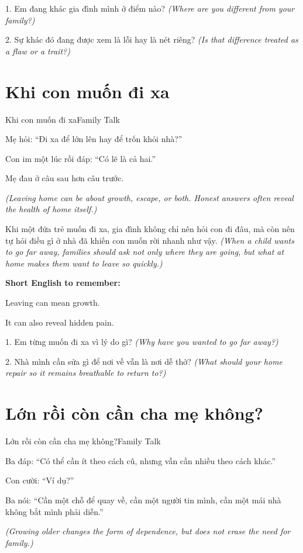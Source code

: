 \begin{tuhocnhanh}
1. Em đang khác gia đình mình ở điểm nào? \textit{(Where are you different from your family?)}

2. Sự khác đó đang được xem là lỗi hay là nét riêng? \textit{(Is that difference treated as a flaw or a trait?)}
\end{tuhocnhanh}
\ngancach

\section{Khi con muốn đi xa}
\begin{truyen}{Khi con muốn đi xa}{Family Talk}

Mẹ hỏi: ``Đi xa để lớn lên hay để trốn khỏi nhà?''

Con im một lúc rồi đáp: ``Có lẽ là cả hai.''

Mẹ đau ở câu sau hơn câu trước.

\textit{(Leaving home can be about growth, escape, or both. Honest answers often reveal the health of home itself.)}
\end{truyen}

\begin{baihoc}
Khi một đứa trẻ muốn đi xa, gia đình không chỉ nên hỏi con đi đâu, mà còn nên tự hỏi điều gì ở nhà đã khiến con muốn rời nhanh như vậy.
\textit{(When a child wants to go far away, families should ask not only where they are going, but what at home makes them want to leave so quickly.)}
\end{baihoc}

\begin{ghinhoanh}
\textbf{Short English to remember:}

Leaving can mean growth.

It can also reveal hidden pain.
\end{ghinhoanh}

\begin{tuhocnhanh}
1. Em từng muốn đi xa vì lý do gì? \textit{(Why have you wanted to go far away?)}

2. Nhà mình cần sửa gì để nơi về vẫn là nơi dễ thở? \textit{(What should your home repair so it remains breathable to return to?)}
\end{tuhocnhanh}
\ngancach

\section{Lớn rồi còn cần cha mẹ không?}
\begin{truyen}{Lớn rồi còn cần cha mẹ không?}{Family Talk}

Ba đáp: ``Có thể cần ít theo cách cũ, nhưng vẫn cần nhiều theo cách khác.''

Con cười: ``Ví dụ?''

Ba nói: ``Cần một chỗ để quay về, cần một người tin mình, cần một mái nhà không bắt mình phải diễn.''

\textit{(Growing older changes the form of dependence, but does not erase the need for family.)}
\end{truyen}

